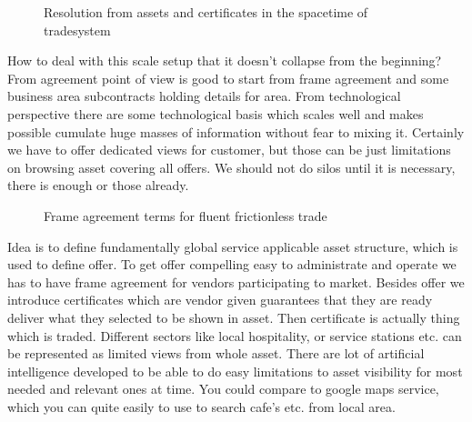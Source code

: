 \begin{figure} %
 \begin{center}
  \caption{Resolution from assets and certificates in the spacetime of tradesystem}
  \label{fig:resolut}
 \end{center}
\end{figure}

How to deal with this scale setup that it doesn't collapse from the beginning? From agreement point of view is good to start from frame agreement and some business area subcontracts holding details for area. From technological perspective there are some technological basis which scales well and makes possible cumulate huge masses of information without fear to mixing it. Certainly we have to offer dedicated views for customer, but those can be just limitations on browsing asset covering all offers. We should not do silos until it is necessary, there is enough or those already.

\begin{figure} %
 \begin{center}
  \caption{Frame agreement terms for fluent frictionless trade}
  \label{fig:terms}
 \end{center}
\end{figure}

Idea is to define fundamentally global service applicable asset structure, which is used to define offer. To get offer compelling easy to administrate and operate we has to have frame agreement for vendors participating to market. Besides offer we introduce certificates which are vendor given guarantees that they are ready deliver what they selected to be shown in asset. Then certificate is actually thing which is traded. Different sectors like local hospitality, or service stations etc. can be represented as limited views from whole asset. There are lot of artificial intelligence developed to be able to do easy limitations to asset visibility for most needed and relevant ones at time. You could compare to google maps service, which you can quite easily to use to search cafe's etc. from local area.

